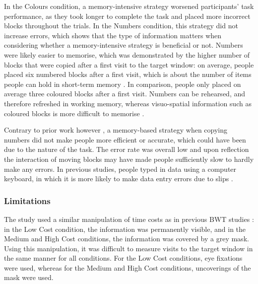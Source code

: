 In the Colours condition, a memory-intensive strategy worsened participants' task performance, as they took longer to complete the task and placed more incorrect blocks throughout the trials. In the Numbers condition, this strategy did not increase errors, which shows that the type of information matters when considering whether a memory-intensive strategy is beneficial or not. Numbers were likely easier to memorise, which was demonstrated by the higher number of blocks that were copied after a first visit to the target window: on average, people placed six numbered blocks after a first visit, which is about the number of items people can hold in short-term memory \citep{Miller1956}. In comparison, people only placed on average three coloured blocks after a first visit. Numbers can be rehearsed, and therefore refreshed in working memory, whereas visuo-spatial information such as coloured blocks is more difficult to memorise \citep{Baddeley1974}. 

Contrary to prior work however \citep{Gray2004, Soboczenski2013}, a memory-based strategy when copying numbers did not make people more efficient or accurate, which could have been due to the nature of the task. The error rate was overall low and upon reflection the interaction of moving blocks may have made people sufficiently slow to hardly make any errors. In previous studies, people typed in data using a computer keyboard, in which it is more likely to make data entry errors due to slips \citep{Oladimeji2011}.
 
 \subsubsection{Limitations}
The study used a similar manipulation of time costs as in previous BWT studies \citep{Morgan2009, Patrick2014, Waldron2007, Waldron2011}: in the Low Cost condition, the information was permanently visible, and in the Medium and High Cost conditions, the information was covered by a grey mask. Using this manipulation, it was difficult to measure visits to the target window in the same manner for all conditions. For the Low Cost conditions, eye fixations were used, whereas for the Medium and High Cost conditions, uncoverings of the mask were used. 

